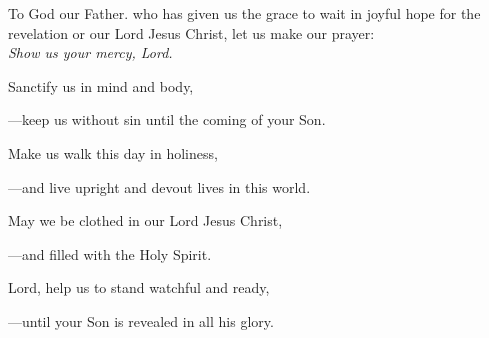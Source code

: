 \intercessions\indent

\begin{hangpar}

To God our Father. who has given us the grace to wait in joyful hope for the revelation or our Lord Jesus Christ, let us make our prayer:\\
\emph{Show us your mercy, Lord.}

\medskip Sanctify us in mind and body,

{\color{red}---\thinspace}keep us without sin until the coming of your Son.

\medskip Make us walk this day in holiness,

{\color{red}---\thinspace}and live upright and devout lives in this world.

\medskip May we be clothed in our Lord Jesus Christ,

{\color{red}---\thinspace}and filled with the Holy Spirit.

\medskip Lord, help us to stand watchful and ready,

{\color{red}---\thinspace}until your Son is revealed in all his glory.

\end{hangpar}